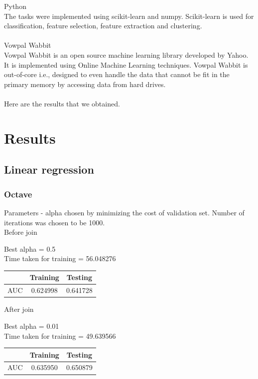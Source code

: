\documentclass[10pt]{article}
\begin{document}
Python\\
The tasks were implemented using scikit-learn and numpy. Scikit-learn is used for classification, feature selection, feature extraction and clustering.\\\\

Vowpal Wabbit\\
Vowpal Wabbit is an open source machine learning library developed by Yahoo. It is implemented using Online Machine Learning techniques. Vowpal Wabbit is out-of-core i.e., designed to even handle the data that cannot be fit in the primary memory by accessing data from hard drives.\\\\

Here are the results that we obtained.

\section{Results}
\subsection{Linear regression}

\subsubsection{Octave}
Parameters - alpha chosen by minimizing the cost of validation set. Number of iterations was chosen to be 1000.
\\

Before join

	Best alpha = 0.5 
\\

	Time taken for training = 56.048276

\begin{center}
 \begin{tabular}{|c | c | c ||} 
 \hline
 & Training & Testing\\ [0.5ex] 
 \hline\hline
AUC & 0.624998 & 0.641728\\
 \hline
\end{tabular}
\end{center}

After join

	Best alpha = 0.01 
\\

	Time taken for training = 49.639566

\begin{center}
 \begin{tabular}{|c | c | c ||} 
 \hline
 & Training & Testing\\ [0.5ex] 
 \hline\hline
AUC & 0.635950 & 0.650879\\
 \hline
\end{tabular}
\end{center}
\end{document}
